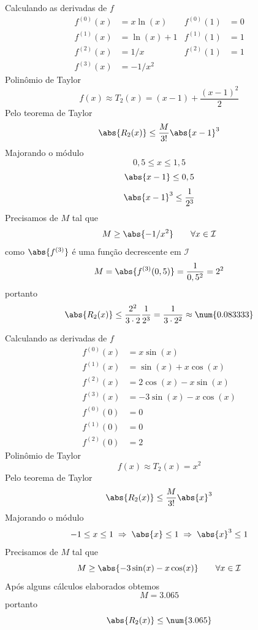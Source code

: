 \begin{exercises}
\begin{exercise}
\begin{answer}
\begin{alphalist}
			\item Calculando as derivadas de $f$
			\begin{align*}
				f^{(0)}(x) & = x\ln(x)  & f^{(0)}(1) & = 0 \\
				f^{(1)}(x) & = \ln(x)+1 & f^{(1)}(1) & = 1 \\
				f^{(2)}(x) & =  1/x     & f^{(2)}(1) & = 1 \\
				f^{(3)}(x) & = -1/x^2   &
			\end{align*}
			Polinômio de Taylor
			\[ f(x) \approx T_2(x) = (x-1) + \frac{(x-1)^2}{2} \]
			Pelo teorema de Taylor
			\[ \abs{R_2(x)} \leq \frac{M}{3!}\abs{x-1}^3 \]
			Majorando o módulo
			\[ 0,5 \leq x \leq 1,5 \]
			\[ \abs{x-1}   \leq 0,5 \]
			\[ \abs{x-1}^3 \leq \frac{1}{2^3} \]
			Precisamos de $M$ tal que
			\[ M \geq \abs{-1/x^2} \qquad \forall x\in \mathcal{I} \]
			como $\abs{f^{(3)}}$ é uma função decrescente em $\mathcal{I}$
			\[ M = \abs{f^{(3)}(0,5)} = \frac{1}{0,5^2} = 2^2 \]
			portanto
			\[
			\abs{R_2(x)}
			\leq \frac{2^2}{3\cdot 2} \frac{1}{2^3}
			= \frac{1}{3\cdot 2^2}
			\approx \num{0.083333}
			\]

			\item Calculando as derivadas de $f$
			\begin{align*}
				f^{(0)}(x) & =  x\sin(x)            \\
				f^{(1)}(x) & =   \sin(x) + x\cos(x) \\
				f^{(2)}(x) & =  2\cos(x) - x\sin(x) \\
				f^{(3)}(x) & = -3\sin(x) - x\cos(x) \\[2mm]
				f^{(0)}(0) & = 0 \\
				f^{(1)}(0) & = 0 \\
				f^{(2)}(0) & = 2
			\end{align*}
			Polinômio de Taylor
			\[ f(x) \approx T_2(x) = x^2 \]
			Pelo teorema de Taylor
			\[ \abs{R_2(x)} \leq \frac{M}{3!}\abs{x}^3 \]
			Majorando o módulo
			\[
			-1 \leq x \leq 1
			\;\Rightarrow\; \abs{x}   \leq 1
			\;\Rightarrow\; \abs{x}^3 \leq 1
			\]
			Precisamos de $M$ tal que
			\[ M \geq \abs{-3\sin(x) - x\cos(x)} \qquad \forall x\in \mathcal{I} \]
			Após alguns cálculos elaborados obtemos
			\[ M = \num{3.065} \]
			portanto
			\[ \abs{R_2(x)} \leq \num{3.065} \]


\end{alphalist}
\end{answer}
\end{exercise}
\end{exercises}
